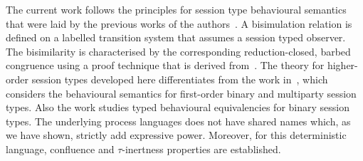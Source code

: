 \iftodo {}
The current work follows the principles for
session type behavioural semantics that were laid
by the previous works of the
authors~\cite{dkphdthesis,KYHH2015,KY2015}.
A bisimulation relation is defined on a labelled
transition system that assumes a session typed
observer.
The bisimilarity is characterised by the corresponding
reduction-closed, barbed congruence using a
proof technique that is derived from~\cite{Hennessy07}.
The theory for higher-order session types developed here
differentiates from 
the work in~\cite{dkphdthesis,KYHH2015,KY2015}, which 
considers the behavioural semantics for first-order
binary and multiparty session types.
Also the work \cite{DBLP:journals/iandc/PerezCPT14} studies typed behavioural equivalencies for binary session types.
The underlying process languages does not have shared names which, as we have shown, strictly add expressive power. 
Moreover, for this deterministic language, confluence and $\tau$-inertness properties are established.

